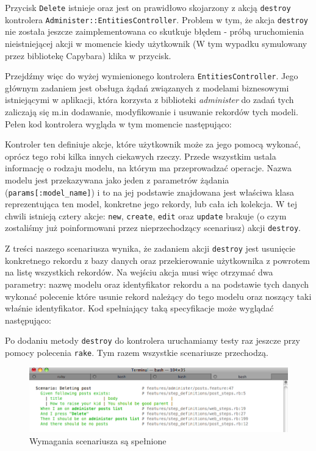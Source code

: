   Przycisk \texttt{Delete} istnieje oraz jest on prawidłowo skojarzony z akcją \texttt{destroy} kontrolera \texttt{Administer::EntitiesController}. Problem w tym, że akcja \texttt{destroy} nie została jeszcze zaimplementowana co skutkuje błędem - próbą uruchomienia nieistniejącej akcji w momencie kiedy użytkownik (W tym wypadku symulowany przez bibliotekę Capybara) klika w przycisk.
  
  Przejdźmy więc do wyżej wymienionego kontrolera \texttt{EntitiesController}. Jego głównym zadaniem jest obsługa żądań związanych z modelami biznesowymi istniejącymi w aplikacji, która korzysta z biblioteki \emph{administer} do zadań tych zaliczają się m.in dodawanie, modyfikowanie i usuwanie rekordów tych modeli. Pełen kod kontrolera wygląda w tym momencie następująco:
  
  
  
  Kontroler ten definiuje akcje, które użytkownik może za jego pomocą wykonać, oprócz tego robi kilka innych ciekawych rzeczy. Przede wszystkim ustala informację o rodzaju modelu, na którym ma przeprowadzać operacje. Nazwa modelu jest przekazywana jako jeden z parametrów żądania (\verb+params[:model_name]+) i to na jej podstawie znajdowana jest właściwa klasa reprezentująca ten model, konkretne jego rekordy, lub cała ich kolekcja.
  W tej chwili istnieją cztery akcje: \texttt{new}, \texttt{create}, \texttt{edit} oraz \texttt{update} brakuje (o czym zostaliśmy już poinformowani przez nieprzechodzący scenariusz) akcji \texttt{destroy}.
  
  Z treści naszego scenariusza wynika, że zadaniem akcji \texttt{destroy} jest usunięcie konkretnego rekordu z bazy danych oraz przekierowanie użytkownika z powrotem na listę wszystkich rekordów. Na wejściu akcja musi więc otrzymać dwa parametry: nazwę modelu oraz identyfikator rekordu a na podstawie tych danych wykonać polecenie które usunie rekord należący do tego modelu oraz noszący taki właśnie identyfikator. Kod spełniający taką specyfikacje może wyglądać następująco: 
  
  
  
  Po dodaniu metody \texttt{destroy} do kontrolera uruchamiamy testy raz jeszcze przy pomocy polecenia \texttt{rake}. Tym razem wszystkie scenariusze przechodzą.
  
  \clearpage
  
   \begin{figure}[!h]
 		\begin{center}
 			\includegraphics[width=\linewidth]{images/delete_record_scenario_pass.png}
 			\caption{Wymagania scenariusza są spełnione}
 			\label{delete_record_scenario_pass}
 		\end{center}
 	\end{figure}
 	
